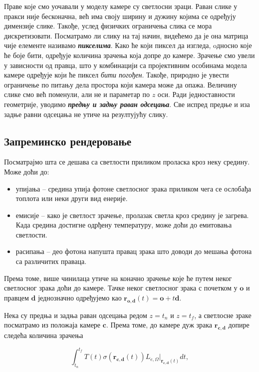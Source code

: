 \documentclass[12pt, a4paper, twoside]{book}
\numberwithin{equation}{chapter}
\numberwithin{theorem}{section}
\numberwithin{definition}{section}
\numberwithin{definitionChapter}{chapter}
\begin{document}
Праве које смо уочавали у моделу камере су светлосни зраци. Раван слике у пракси није бесконачна, већ има своју
ширину и дужину којима се одређују димензије слике. Такође, услед физичких ограничења слика се мора дискретизовати.
Посматрамо ли слику на тај начин, видећемо да је она матрица чије елементе називамо \textbf{\textit{пикселима}}.
Како ће који пиксел да изгледа, oдносно које ће боје бити, одређује количина зрачења која допре до камере.
Зрачење смо увели у зависности од правца, што у комбинацији са пројективним особинама модела камере одређује
који ће пиксел \textit{бити погођен}. Такође, природно је увести ограничење по питању дела простора који
камера може да опажа. Величину слике смо већ поменули, али не и параметар по $z$ оси. Ради једноставности
геометрије, уводимо \textbf{\textit{предњу и задњу раван одсецања}}. Све испред предње и иза задње равни одсецања
не утиче на резултујућу слику.

\subsection{Запреминско рендеровање}
Посматрајмо шта се дешава са светлости приликом проласка кроз неку средину. Може доћи до:
\begin{itemize}
	\item упијања -- средина упија фотоне светлосног зрака приликом чега се ослобађа топлота
	или неки други вид енерије.
	\item емисије -- како је светлост зрачење, пролазак светла кроз средину је загрева.
	Када средина достигне одрђену температуру, може доћи до емитовања светлости.
	\item расипања -- део фотона напушта правац зрака што доводи до мешања фотона
	са различитих праваца.
\end{itemize}

Према томе, више чинилаца утиче на коначно зрачење које ће путем неког светлосног зрака доћи до камере.
Тачке неког светлосног зрака с почетком у $\mathbf{o}$ и правцем $\mathbf{d}$ једнозначно одређујемо
као $\mathbf{r_{o, d}}(t) = \mathbf{o} + t\mathbf{d}$.

Нека су предња и задња раван одсецања редом $z=t_n$ и $z=t_f$, а светлосне зраке посматрамо из положаја
камере $\mathbf{c}$. Према томе, до камере дуж зрака $\mathbf{r_{c, d}}$ допире следећа
количина зрачења

\begin{equation}
	\int_{t_n}^{t_f}T(t)\sigma(\mathbf{r_{c, d}}(t))L_{e, \Omega}\bigr|_{\mathbf{r_{c, d}}(t)}dt,
	\label{eqn-volume-rendering-radiance}
\end{equation}
\end{document}
